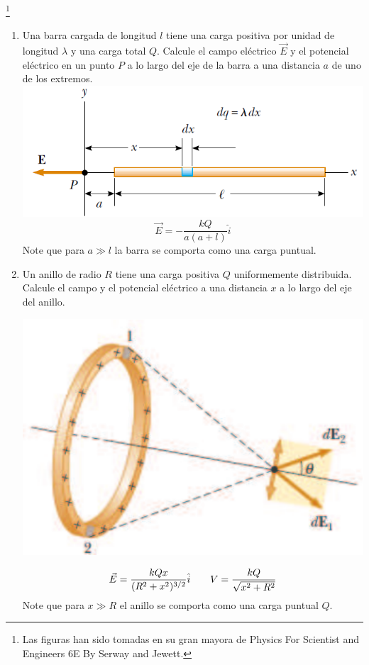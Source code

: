 \documentclass[11pt,twocolumn]{article}
\title{}
\author{}
\date{}
\begin{document}
\pagestyle{empty}
\sffamily
{}
\footnote{Las figuras han sido tomadas en su gran mayora de Physics For Scientist and Engineers 6E By Serway and Jewett.}

\begin{enumerate}
\item Una barra cargada de longitud $l$ tiene una carga positiva por unidad de longitud $\lambda$ y una carga total $Q$. Calcule el campo eléctrico $\vec{E}$ y el potencial eléctrico en un punto $P$ a lo largo del eje de la barra a una distancia $a$ de uno de los extremos.
{
\includegraphics[scale=0.3]{barra}
}
\begin{displaymath}
\vec{E}=-\dfrac{kQ}{a(a+l)} \hat{i}
\end{displaymath}
\small{Note que para $a\gg l$ la barra se comporta como una carga puntual.} 

\item Un anillo de radio $R$ tiene una carga positiva $Q$ uniformemente distribuida. Calcule el campo y el potencial eléctrico a una distancia $x$ a lo largo del eje del anillo.
{
\begin{center}
\includegraphics[scale=0.3]{anillo}
\end{center}
}
\begin{displaymath}
\vec{E}=\dfrac{kQ x}{(R^2+x^2)^{3/2}} \hat{i} \hspace{0.7 cm} V=\dfrac{kQ}{\sqrt{x^2 +R^2}}
\end{displaymath}
\small{Note que para $x\gg R$ el anillo se comporta como una carga puntual $Q$.} 


\end{enumerate}
\end{document}
